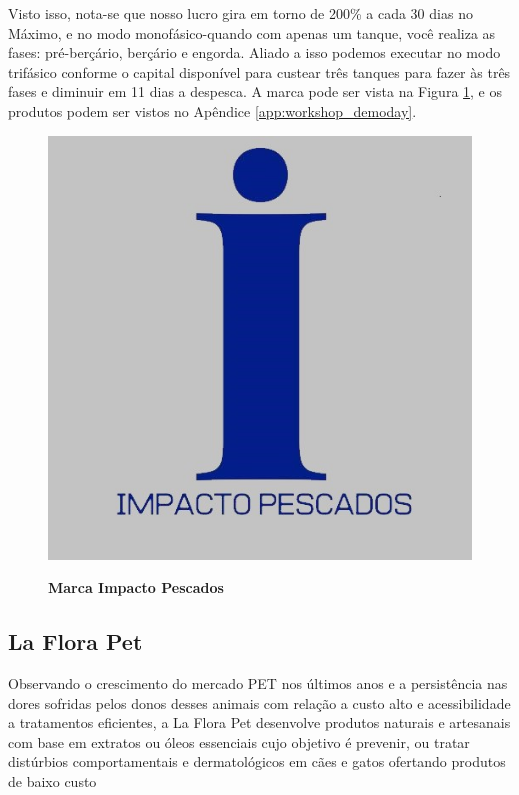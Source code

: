 Visto isso, nota-se que nosso lucro gira em torno de 200\% a cada 30 dias no Máximo, e  no modo monofásico-quando com apenas um tanque, você realiza  as fases: pré-berçário, berçário e engorda. Aliado a isso podemos executar no modo trifásico conforme o capital disponível para custear três tanques para fazer às três fases e diminuir em 11 dias a despesca.  A marca pode ser vista na Figura \ref{figura_23}, e os produtos podem ser vistos no Apêndice \ref{app:workshop_demoday}.

\begin{figure}[H]
\centering
\caption{\textbf{Marca Impacto Pescados}}
\includegraphics[scale=0.4]{Imagens/impacto_pescados.jpg}
\label{figura_23}
\end{figure}


\subsection{La Flora Pet}

Observando o crescimento do mercado PET nos últimos anos e a persistência nas dores sofridas pelos donos desses animais com relação a custo alto e acessibilidade a tratamentos eficientes, a La Flora Pet desenvolve produtos naturais e artesanais com base em extratos ou óleos essenciais cujo objetivo é prevenir, ou tratar distúrbios comportamentais e dermatológicos em cães e gatos ofertando produtos de baixo custo

